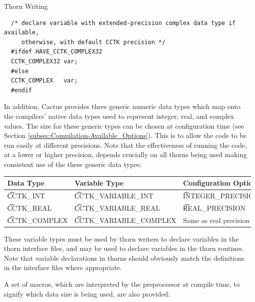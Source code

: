 \begin{cactuspart}{Thorn Writing}
\begin{verbatim}
  /* declare variable with extended-precision complex data type if available,
     otherwise, with default CCTK precision */
  #ifdef HAVE_CCTK_COMPLEX32
  CCTK_COMPLEX32 var;
  #else
  CCTK_COMPLEX   var;
  #endif
\end{verbatim}

In addition, Cactus provides three generic numeric data types which map onto
the compilers' native data types used to represent integer, real, and complex
values. The size for these generic types can be chosen at configuration time
(see Section \ref{subsec:Compilation-Available_Options}). This is to allow the code to
be run easily at different precisions. Note that the effectiveness of running
the code, at a lower or higher precision, depends crucially on all thorns being
used making consistent use of the these generic data types:

\begin{center}
\begin{tabular}{|l|l|l|l|}
\hline
Data Type          & Variable Type & Configuration Option\\
\hline
{\t CCTK\_INT}     & {\t CCTK\_VARIABLE\_INT} & {\t INTEGER\_PRECISION}\\
{\t CCTK\_REAL}    & {\t CCTK\_VARIABLE\_REAL} & {\t REAL\_PRECISION}\\
{\t CCTK\_COMPLEX} & {\t CCTK\_VARIABLE\_COMPLEX} & Same as real precision\\
\hline
\end{tabular}
\end{center}


These variable types must be used by thorn writers to declare variables
 in the thorn interface files, and may be used to declare
variables in the thorn routines. Note that variable declarations in
thorns should obviously match the definitions in the interface files
where appropriate.

A set of macros, which
are interpreted by the preprocessor at compile time, to signify which
data size is being used, are also provided:


\end{cactuspart}
